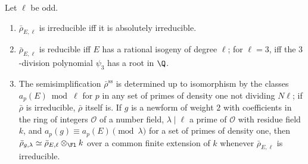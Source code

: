 \begin{proposition}[irreducibility]\label{prop:galrep:irreducibility}
Let $\ell$ be odd.
\begin{enumerate}[label=(\roman*)]
\item $\bar\rho_{E,\ell}$ is irreducible iff it is absolutely irreducible.
\item $\bar\rho_{E,\ell}$ is reducible iff $E$ has a rational isogeny of degree $\ell$; for $\ell=3$, iff the $3$-division polynomial $\psi_3$ has a root
in $\Q$.
\item The semisimplification $\bar\rho^{\mathrm{ss}}$ is determined up to isomorphism by the classes $a_p(E)\bmod\ell$ for $p$ in any set of primes of
density one not dividing $N\ell$; if $\bar\rho$ is irreducible, $\bar\rho$ itself is. If $g$ is a newform of weight $2$ with coefficients in the ring of
integers $\mathcal O$ of a number field, $\lambda\mid\ell$ a prime of $\mathcal O$ with residue field $k$, and $a_p(g)\equiv a_p(E)\pmod\lambda$ for a set of
primes of density one, then $\bar\rho_{g,\lambda}\simeq\bar\rho_{E,\ell}\otimes_{\Fl}k$ over a common finite extension of $k$ whenever $\bar\rho_{E,\ell}$ is irreducible.
\end{enumerate}
\end{proposition}

